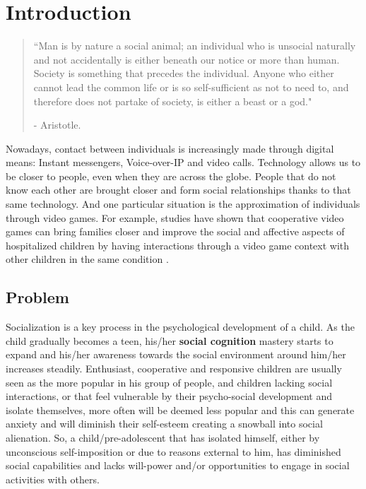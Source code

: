 \section{Introduction}
\label{sec:intro}

\begin{quotation}
``Man is by nature a social animal; an individual who is unsocial naturally and not accidentally is either beneath our notice or more than human. Society is something that precedes the individual. Anyone who either cannot lead the common life or is so self-sufficient as not to need to, and therefore does not partake of society, is either a beast or a god."
\par - Aristotle.
\end{quotation}

\par Nowadays, contact between individuals is increasingly made through digital means: Instant messengers, Voice-over-IP and video calls. Technology allows us to be closer to people, even when they are across the globe. People that do not know each other are brought closer and form social relationships thanks to that same technology. And one particular situation is the approximation of individuals through video games. For example, studies have shown that cooperative video games can bring families closer \cite{wang_taylor_sun_2018} and improve the social and affective aspects of hospitalized children by having interactions through a video game context with other children in the same condition \cite{gonzalez-gonzalez_toledo-delgado_collazos-ordonez_gonzalez-sanchez_2014}. 

\subsection{Problem}
\par Socialization is a key process in the psychological development of a child. As the child gradually becomes a teen, his/her \textbf{social cognition} mastery starts to expand and his/her awareness towards the social environment around him/her increases steadily. Enthusiast, cooperative and responsive children are usually seen as the more popular in his group of people, and children lacking social interactions, or that feel vulnerable by their psycho-social development and isolate themselves, more often will be deemed less popular and this can generate anxiety and will diminish their self-esteem \cite{tavares_pereira_gomes_monteiro_gomes_2007} \cite{campos_1990} creating a snowball into social alienation. So, a child/pre-adolescent that has isolated himself, either by unconscious self-imposition or due to reasons external to him, has diminished social capabilities and lacks will-power and/or opportunities to engage in social activities with others. 

